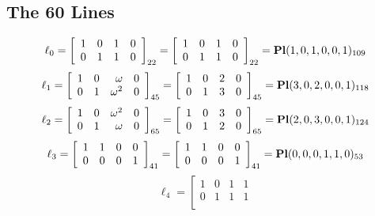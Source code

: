 \documentclass{article}
\begin{document}
{\subsection*{The 60 Lines}
$$
\ell_{0} = 
\left[
\begin{array}{*{4}{r}}
1 & 0 & 1 & 0\\
0 & 1 & 1 & 0\\
\end{array}
\right]
_{22}
=
\left[
\begin{array}{*{4}c}
1  & 0  & 1  & 0\\
0  & 1  & 1  & 0\\
\end{array}
\right]_{22}
={\rm\bf Pl}(1,0,1,0,0,1 )_{109}$$
$$
\ell_{1} = 
\left[
\begin{array}{*{4}{r}}
1 & 0 & \omega  & 0\\
0 & 1 & \omega^{2} & 0\\
\end{array}
\right]
_{45}
=
\left[
\begin{array}{*{4}c}
1  & 0  & 2  & 0\\
0  & 1  & 3  & 0\\
\end{array}
\right]_{45}
={\rm\bf Pl}(3,0,2,0,0,1 )_{118}$$
$$
\ell_{2} = 
\left[
\begin{array}{*{4}{r}}
1 & 0 & \omega^{2} & 0\\
0 & 1 & \omega  & 0\\
\end{array}
\right]
_{65}
=
\left[
\begin{array}{*{4}c}
1  & 0  & 3  & 0\\
0  & 1  & 2  & 0\\
\end{array}
\right]_{65}
={\rm\bf Pl}(2,0,3,0,0,1 )_{124}$$
$$
\ell_{3} = 
\left[
\begin{array}{*{4}{r}}
1 & 1 & 0 & 0\\
0 & 0 & 0 & 1\\
\end{array}
\right]
_{41}
=
\left[
\begin{array}{*{4}c}
1  & 1  & 0  & 0\\
0  & 0  & 0  & 1\\
\end{array}
\right]_{41}
={\rm\bf Pl}(0,0,0,1,1,0 )_{53}$$
$$
\ell_{4} = 
\left[
\begin{array}{*{4}{r}}
1 & 0 & 1 & 1\\
0 & 1 & 1 & 1\\

\end{array}$$}
\end{document}
